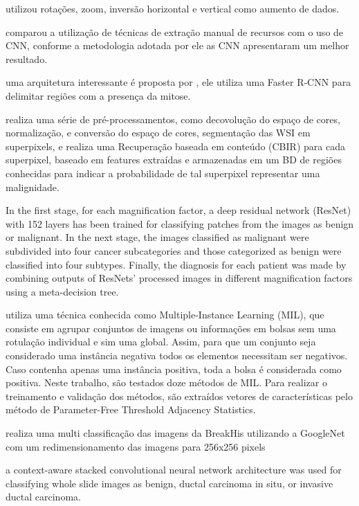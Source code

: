 \documentclass[preprint,12pt,authoryear]{elsarticle}
\begin{document}
\cite{PAN2018} utilizou rotações, zoom, inversão horizontal e vertical como aumento de dados.

\cite{BARDOU2018} comparou a utilização de técnicas de extração manual de recursos com o uso de CNN, conforme a metodologia adotada por ele as CNN apresentaram um melhor resultado.

\cite{LI2018} uma arquitetura interessante é proposta por \cite{LI2018}, ele utiliza uma Faster R-CNN para delimitar regiões com a presença da mitose.

\cite{ZHENG2018} realiza uma série de pré-processamentos, como decovolução do espaço de cores, normalização, e conversão do espaço de cores, segmentação das WSI em superpixels, e realiza uma Recuperação baseada em conteúdo (CBIR) para cada superpixel, baseado em features extraídas e armazenadas em um BD de regiões conhecidas para indicar a probabilidade de tal superpixel representar uma malignidade.

\cite{GANDOMKAR2018a} In the first stage, for each magnification factor, a deep residual network (ResNet) with 152 layers has been trained for classifying patches from the images as benign or malignant. In the next stage, the images classified as malignant were subdivided into four cancer subcategories and those categorized as benign were classified into four subtypes. Finally, the diagnosis for each patient was made by combining outputs of ResNets’ processed images in different magnification factors using a meta-decision tree.

\cite{OLIVEIRA2018} utiliza uma técnica conhecida como Multiple-Instance Learning (MIL), que consiste em agrupar conjuntos de imagens ou informações em bolsas sem uma rotulação individual e sim uma global. Assim, para que um conjunto seja considerado uma instância negativa todos os elementos necessitam ser negativos. Caso contenha apenas uma instância positiva, toda a bolsa é considerada como positiva. Neste trabalho, são testados doze métodos de MIL. Para realizar o treinamento e validação dos métodos, são extraídos vetores de características pelo método de Parameter-Free Threshold Adjacency Statistics.

\cite{HAN2017} realiza uma multi classificação das imagens da BreakHis utilizando a GoogleNet com um redimensionamento das imagens para 256x256 pixels

\cite{BEJNORDI2017} a context-aware stacked convolutional neural network architecture was used for classifying whole slide images as benign, ductal carcinoma in situ, or invasive ductal carcinoma.
\end{document}
